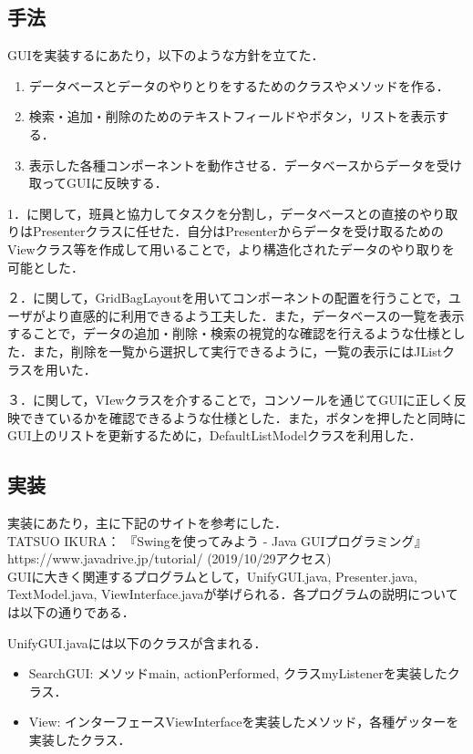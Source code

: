 \documentclass[12pt]{jarticle}
\begin{document}
\subsection{手法}
GUIを実装するにあたり，以下のような方針を立てた．
\begin{enumerate}
\item データベースとデータのやりとりをするためのクラスやメソッドを作る．
\item 検索・追加・削除のためのテキストフィールドやボタン，リストを表示する．
\item 表示した各種コンポーネントを動作させる．データベースからデータを受け取ってGUIに反映する．
\end{enumerate}

1．に関して，班員と協力してタスクを分割し，データベースとの直接のやり取りはPresenterクラスに任せた．自分はPresenterからデータを受け取るためのViewクラス等を作成して用いることで，より構造化されたデータのやり取りを可能とした．

２．に関して，GridBagLayoutを用いてコンポーネントの配置を行うことで，ユーザがより直感的に利用できるよう工夫した．また，データベースの一覧を表示することで，データの追加・削除・検索の視覚的な確認を行えるような仕様とした．また，削除を一覧から選択して実行できるように，一覧の表示にはJListクラスを用いた．

３．に関して，VIewクラスを介することで，コンソールを通じてGUIに正しく反映できているかを確認できるような仕様とした．また，ボタンを押したと同時にGUI上のリストを更新するために，DefaultListModelクラスを利用した．

\clearpage

\subsection{実装}

実装にあたり，主に下記のサイトを参考にした． \\

TATSUO IKURA： 『Swingを使ってみよう - Java GUIプログラミング』 https://www.javadrive.jp/tutorial/ (2019/10/29アクセス) \\

GUIに大きく関連するプログラムとして，UnifyGUI.java, Presenter.java, TextModel.java, ViewInterface.javaが挙げられる．各プログラムの説明については以下の通りである．

UnifyGUI.javaには以下のクラスが含まれる．
\begin{itemize}
\item SearchGUI: メソッドmain, actionPerformed, クラスmyListenerを実装したクラス．
\item View: インターフェースViewInterfaceを実装したメソッド，各種ゲッターを実装したクラス．
\end{itemize}
\end{document}
